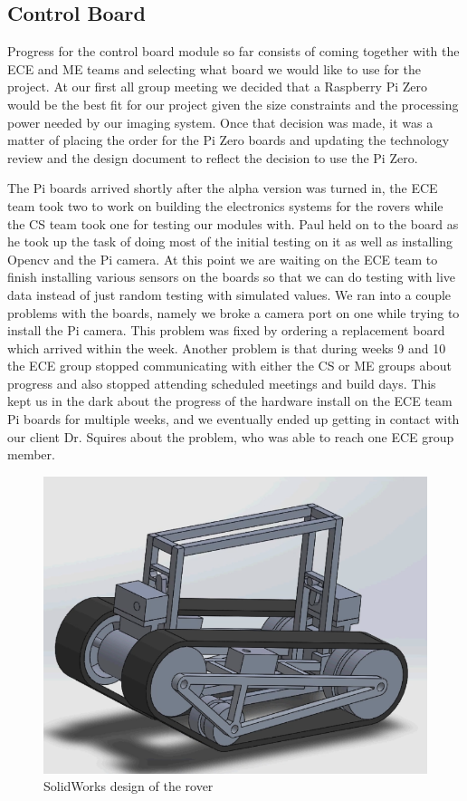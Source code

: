 \documentclass[10pt,letterpaper,onecolumn,draftclsnofoot,journal]{IEEEtran}
\begin{document}
\subsection{Control Board}
Progress for the control board module so far consists of coming together with the ECE and ME teams and selecting what board we would like to use for the project. At our first all group meeting we decided that a Raspberry Pi Zero would be the best fit for our project given the size constraints and the processing power needed by our imaging system. Once that decision was made, it was a matter of placing the order for the Pi Zero boards and updating the technology review and the design document to reflect the decision to use the Pi Zero.
\par
The Pi boards arrived shortly after the alpha version was turned in, the ECE team took two to work on building the electronics systems for the rovers while the CS team took one for testing our modules with. Paul held on to the board as he took up the task of doing most of the initial testing on it as well as installing Opencv and the Pi camera. At this point we are waiting on the ECE team to finish installing various sensors on the boards so that we can do testing with live data instead of just random testing with simulated values. We ran into a couple problems with the boards, namely we broke a camera port on one while trying to install the Pi camera. This problem was fixed by ordering a replacement board which arrived within the week. Another problem is that during weeks 9 and 10 the ECE group stopped communicating with either the CS or ME groups about progress and also stopped attending scheduled meetings and build days. This kept us in the dark about the progress of the hardware install on the ECE team Pi boards for multiple weeks, and we eventually ended up getting in contact with our client Dr. Squires about the problem, who was able to reach one ECE group member.
\begin{figure}[H]
	\centering
	\includegraphics[scale = .4]{Capture.PNG}
	\caption{SolidWorks design of the rover}
	\label{fig:design}
\end{figure}
\end{document}
